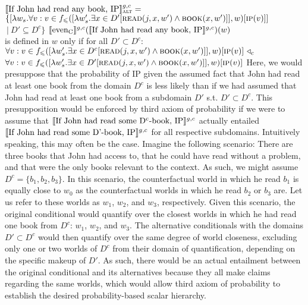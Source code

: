 \a{} $\intension[g,c]{If John had read any book, IP}_{\text{\scshape alt}}=$\\$\{[\lambda w_s.\forall v:v\in f_\leqslant([\lambda w'_s.\exists{x\in{D'}}[\predicate{read}(j,x,w')\land\predicate{book}(x,w')]],w)[\predicate{ip}(v)]]$\\\emptyfill$~|~D'\subseteq D^c\}$
\xe
\ex{}
$\intension[g,c]{even\textsubscript{C}}(\intension[g,c]{If John had read any book, IP})(w)$\\ is defined in $w$ only if for all $D'\subset D^c$:\\
$\forall v:v\in f_\leqslant([\lambda w'_s.\exists{x\in D^c}[\predicate{read}(j,x,w')\land\predicate{book}(x,w')]],w)[\predicate{ip}(v)]~\lprob_c$\\\emptyfill$\forall v:v\in f_\leqslant([\lambda w'_s.\exists{x\in D'}[\predicate{read}(j,x,w')\land\predicate{book}(x,w')]],w)[\predicate{ip}(v)]$
\xe
Here, we would presuppose that the probability of IP given the assumed fact that John had read at least one book from the domain $D^c$ is less likely than if we had assumed that John had read at least one book from a subdomain $D'$ s.t. $D'\subset D^c$. This presupposition would be enforced by  third axiom of probability if we were to assume that $\intension[g,c]{If John had read some D\textsuperscript{c}-book, IP}$ actually entailed $\intension[g,c]{If John had read some D'-book, IP}$ for all respective subdomains. Intuitively speaking, this may often be the case. Imagine the following scenario: There are three books that John had access to, that he could have read without a problem, and that were the only books relevant to the context. As such, we might assume $D^c=\{b_1,b_2,b_3\}$. In this scenario, the counterfactual world in which he read $b_1$ is equally close to $w_0$ as the counterfactual worlds in which he read $b_2$ or $b_3$ are. Let us refer to these worlds as $w_1$, $w_2$, and $w_3$, respectively. Given this scenario, the original conditional would quantify over the closest worlds in which he had read one book from $D^c$: $w_1$, $w_2$, and $w_3$. The alternative conditionals with the domains $D'\subset D^c$ would then quantify over the same degree of world closeness, excluding only one or two worlds of $D^c$ from their domain of quantification, depending on the specific makeup of $D'$. As such, there would be an actual entailment between the original conditional and its alternatives because they all make claims regarding the same worlds, which would allow  third axiom of probability to establish the desired probability-based scalar hierarchy.

